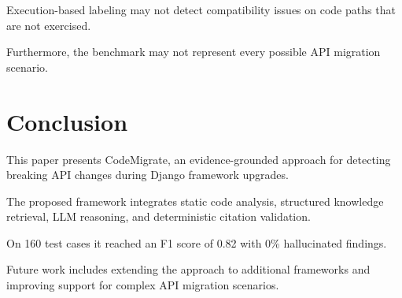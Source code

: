 \documentclass[conference]{IEEEtran}
\begin{document}
Execution-based labeling may not detect compatibility
issues on code paths that are not exercised.

Furthermore, the benchmark may not represent every
possible API migration scenario.

\section{Conclusion}

This paper presents CodeMigrate, an evidence-grounded
approach for detecting breaking API changes during
Django framework upgrades.

The proposed framework integrates static code analysis,
structured knowledge retrieval, LLM reasoning,
and deterministic citation validation.

On 160 test cases it reached an F1 score of 0.82 with 0\% hallucinated findings.

Future work includes extending the approach to
additional frameworks and improving support for
complex API migration scenarios.



\end{document}

